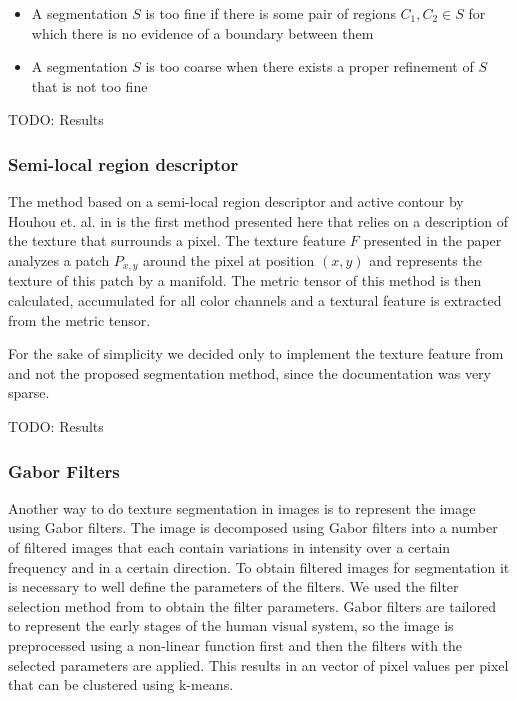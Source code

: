 \documentclass[pdftex,12pt,a4paper]{report}
\begin{document}
\begin{itemize}
	\item A segmentation $S$ is too fine if there is some pair of regions $C_1, C_2 \in S$ for which there is no evidence of a boundary between them
	\item A segmentation $S$ is too coarse when there exists a proper refinement of $S$ that is not too fine
\end{itemize}

TODO: Results

\subsubsection{Semi-local region descriptor}

The method based on a semi-local region descriptor and active contour by Houhou et. al. in \cite{houhou2009fast} is the first method presented here that relies on a description of the texture that surrounds a pixel. The texture feature $F$ presented in the paper analyzes a patch $P_{x,y}$ around the pixel at position $(x,y)$ and represents the texture of this patch by a manifold. The metric
tensor of this method is then calculated, accumulated for all color channels and a textural feature is extracted from the metric tensor.

For the sake of simplicity we decided only to implement the texture feature from \cite{houhou2009fast} and not the proposed segmentation method, since the documentation was very sparse.

TODO: Results

\subsubsection{Gabor Filters}

Another way to do texture segmentation in images is to represent the image using Gabor filters. The image is decomposed using Gabor filters into a number of filtered images that each contain variations in intensity over a certain frequency and in a certain direction. To obtain filtered images for segmentation it is necessary to well define the parameters of the filters. We used the filter selection method from \cite{jain1990unsupervised} to obtain the filter parameters. Gabor filters are tailored to represent the early stages of the human visual system, so the image is preprocessed using a non-linear function first and then the filters with the selected parameters are applied. This results in an vector of pixel values per pixel that can be clustered using k-means.
\end{document}
